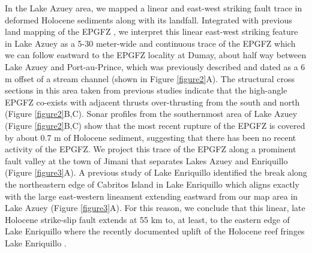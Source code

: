 \documentclass[man,natbib]{apa6}
\begin{document}
In the Lake Azuey area, we mapped a linear and east-west striking fault trace in deformed Holocene sediments along with its landfall. Integrated with previous land mapping of the EPGFZ \citep{mann1995actively,prentice2010seismic,cowgill2012interactive}, we interpret this linear east-west striking feature in Lake Azuey as a 5-30 meter-wide and continuous trace of the EPGFZ which we can follow eastward to the EPGFZ locality at Dumay, about half way between Lake Azuey and Port-au-Prince, which was previously described and dated as a 6 m offset of a stream channel \citep{cowgill2012interactive} (shown in Figure \ref{figure2}A). The structural cross sections in this area taken from previous studies \citep{massoni1955haiti,mann1995actively,douilly2015three} indicate that the high-angle EPGFZ co-exists with adjacent thrusts over-thrusting from the south and north (Figure \ref{figure2}B,C). Sonar profiles from the southernmost area of Lake Azuey (Figure \ref{figure2}B,C) show that the most recent rupture of the EPGFZ is covered by about 0.7 m of Holocene sediment, suggesting that there has been no recent activity of the EPGFZ. We project this trace of the EPGFZ along a prominent fault valley at the town of Jimani that separates Lakes Azuey and Enriquillo (Figure \ref{figure3}A). A previous study of Lake Enriquillo \citep{rios2013holocene} identified the break along the northeastern edge of Cabritos Island in Lake Enriquillo which aligns exactly with the large east-western lineament extending eastward from our map area in Lake Azuey (Figure \ref{figure3}A). For this reason, we conclude that this linear, late Holocene strike-slip fault extends at 55 km to, at least, to the eastern edge of Lake Enriquillo where the recently documented uplift of the Holocene reef fringes Lake Enriquillo \citep{mann1995actively}.  
\end{document}
